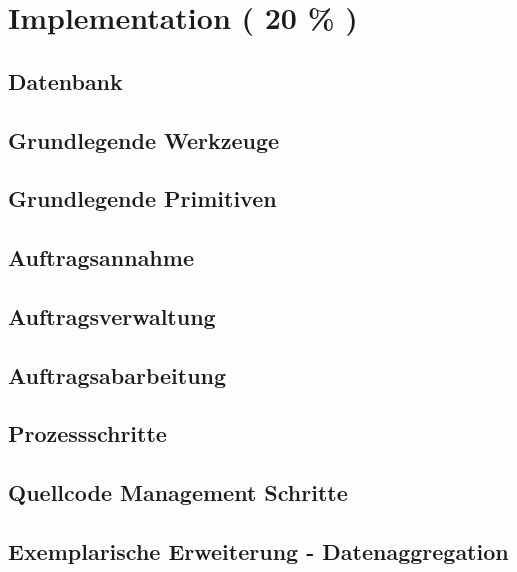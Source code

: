 \chapter{Implementation ( 20 \% ) }
\section{Datenbank}
\section{Grundlegende Werkzeuge}
\section{Grundlegende Primitiven}
\section{Auftragsannahme}
\section{Auftragsverwaltung}
\section{Auftragsabarbeitung}
\section{Prozessschritte}
\section{Quellcode Management Schritte}
\section{Exemplarische Erweiterung - Datenaggregation}
